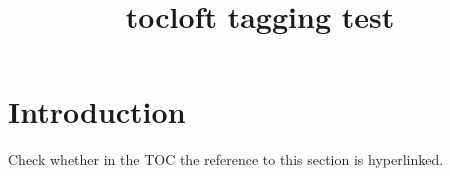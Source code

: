 \documentclass{article}
\title{tocloft tagging test}
\begin{document}
\tableofcontents
\section{Introduction}
Check whether in the TOC the reference to this section is hyperlinked.
\end{document}
